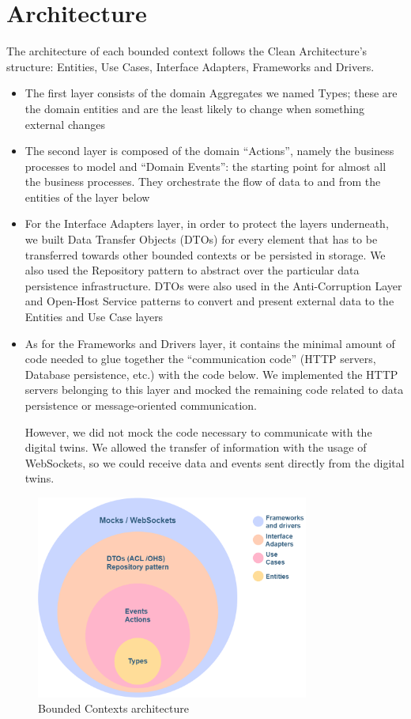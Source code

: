 \chapter{Architecture}
The architecture of each bounded context follows the Clean Architecture's structure: Entities, Use Cases, Interface Adapters, Frameworks and Drivers.

\begin{itemize}
    \item The first layer consists of the domain Aggregates we named Types; these are the domain entities and are the least likely to change when something external changes
    \item The second layer is composed of the domain ``Actions'', namely the business processes to model and ``Domain Events'': the starting point for almost all the business processes. They orchestrate the flow of data to and from the entities of the layer below
    \item For the Interface Adapters layer, in order to protect the layers underneath, we built Data Transfer Objects (DTOs) for every element that has to be transferred towards other bounded contexts or be persisted in storage. We also used the Repository pattern to abstract over the particular data persistence infrastructure. DTOs were also used in the Anti-Corruption Layer and Open-Host Service patterns to convert and present external data to the Entities and Use Case layers
    \item As for the Frameworks and Drivers layer, it contains the minimal amount of code needed to glue together the ``communication code'' (HTTP servers, Database persistence, etc.) with the code below. We implemented the HTTP servers belonging to this layer and mocked the remaining code related to data persistence or message-oriented communication.
    
    However, we did not mock the code necessary to communicate with the digital twins.
    We allowed the transfer of information with the usage of WebSockets, so we could receive data and events sent directly from the digital twins.
\end{itemize}


\begin{figure}[H]
    \centering
    \includegraphics[width=0.8\textwidth]{img/clean-architecture.png}
    \caption{Bounded Contexts architecture}
    \label{img:clean-architecture}
\end{figure}

